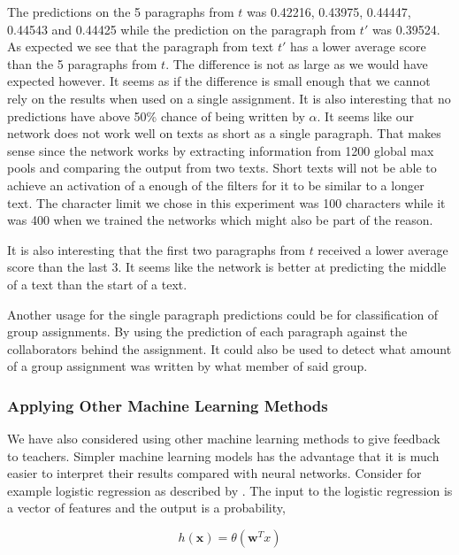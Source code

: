 The predictions on the 5 paragraphs from $t$ was 0.42216, 0.43975, 0.44447,
0.44543 and 0.44425 while the prediction on the paragraph from $t'$ was 0.39524.
As expected we see that the paragraph from text $t'$ has a lower average score
than the 5 paragraphs from $t$. The difference is not as large as we would
have expected however. It seems as if the difference is small enough that
we cannot rely on the results when used on a single assignment. It is also
interesting that no predictions have above 50\% chance of being written by
$\alpha$. It seems like our network does not work well on texts as short as
a single paragraph. That makes sense since the network works by extracting
information from 1200 global max pools and comparing the output from two texts.
Short texts will not be able to achieve an activation of a enough of the filters
for it to be similar to a longer text. The character limit we chose in this
experiment was 100 characters while it was 400 when we trained the networks
which might also be part of the reason.

It is also interesting that the first two paragraphs from $t$ received a lower
average score than the last 3. It seems like the network is better at predicting
the middle of a text than the start of a text.

Another usage for the single paragraph predictions could be for classification
of group assignments. By using the prediction of each paragraph against the
collaborators behind the assignment. It could also be used to detect what amount
of a group assignment was written by what member of said group.


\subsubsection{Applying Other Machine Learning Methods}
\label{subsubsec:applying-other-machine-learning-methods}

We have also considered using other machine learning methods to give feedback
to teachers. Simpler machine learning models has the advantage that it is much
easier to interpret their results compared with neural networks. Consider for
example logistic regression as described by \citet{Abu-Mostafa:2012:LD:2207825}.
The input to the logistic regression is a vector of features and the output is a
probability,

\begin{equation}
    h(\mathbf{x}) = \theta(\mathbf{w}^Tx)
\end{equation}

